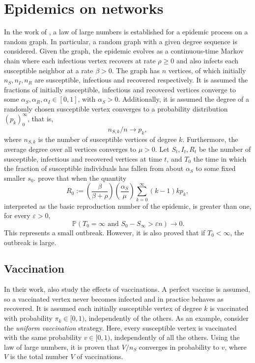 \documentclass[letterpaper, 10 pt, conference]{article}
\newcommand\pr[1]{\, \mathbb{P} \left( #1 \right)}
\begin{document}
\section{Epidemics on networks}
In the work of \citet{janson2014law}, a law of large numbers is established for a epidemic process on a random graph. In particular, a random graph with a given degree sequence is considered. Given the graph, the epidemic evolves as a continuous-time Markov chain \citep{Liggett_2010} where each infectious vertex recovers at rate $\rho \geq 0$ and also infects each susceptible neighbor at a rate $\beta > 0$. The graph has $n$ vertices, of which initially $n_S, n_I, n_R$ are susceptible, infectious and recovered respectively. It is assumed the fractions of initially susceptible, infectious and recovered vertices converge to some $\alpha_S, \alpha_R, \alpha_I \in [0,1]$, with $\alpha_S > 0$. Additionally, it is assumed the degree of a randomly chosen susceptible vertex converges to a probability distribution $(p_k)_{0}^{\infty}$, that is, 
\begin{equation}
	n_{S,k} / n \rightarrow p_k,
\end{equation}
where $n_{S,k}$ is the number of susceptible vertices of degree $k$. Furthermore, the average degree over all vertices converges to $\mu > 0$. Let $S_t, I_t, R_t$ be the number of susceptible, infectious and recovered vertices at time $t$, and $T_0$ the time in which the fraction of susceptible individuals has fallen from about $\alpha_S$ to some fixed smaller $s_0$. \citet{janson2014law} prove that when the quantity
\begin{equation}
	R_0 := \left( \frac{\beta}{\beta + \rho}\right) \left( \frac{\alpha_S}{\mu} \right) \sum_{k = 0}^{\infty} (k-1) k p_k,
\end{equation}
interpreted as the basic reproduction number of the epidemic, is greater than one, for every $\varepsilon > 0$,
\begin{equation}
	\pr{T_0 = \infty \text{ and } S_0 - S_\infty > \varepsilon n} \rightarrow 0.
\end{equation}
This represents a small outbreak. However, it is also proved that if $T_0 < \infty$, the outbreak is large.

\subsection{Vaccination}
In their work, \citet{janson2014law} also study the effects of vaccinations. A perfect vaccine is assumed, so a vaccinated vertex never becomes infected and in practice behaves as recovered. It is assumed each initially susceptible vertex of degree $k$ is vaccinated with probability $\pi_k \in [0,1)$, independently of the others. As an example, consider the \textit{uniform vaccination} strategy. Here, every susceptible vertex is vaccinated with the same probability $v \in [0, 1)$, independently of all the others. Using the law of large numbers, it is proven that $V/n_S$ converges in probability to $v$, where $V$ is the total number $V$ of vaccinations. 


\end{document}
